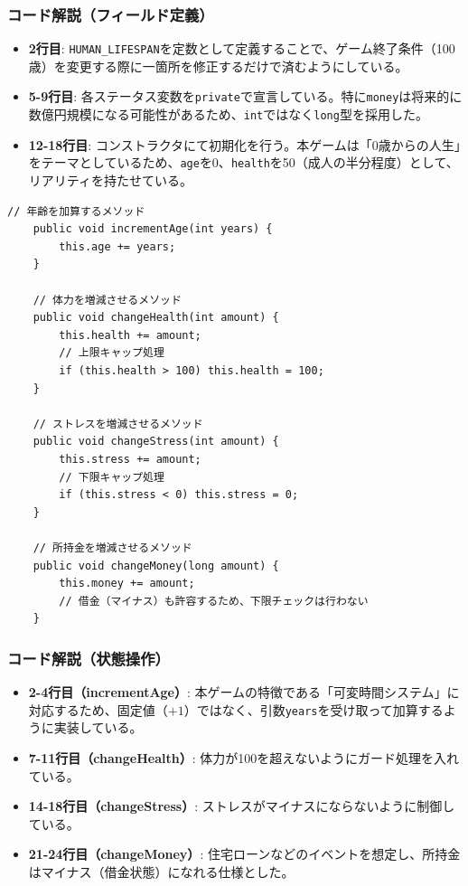 \documentclass[a4paper,11pt]{jsarticle}
\begin{document}
\subsubsection*{コード解説（フィールド定義）}
\begin{itemize}
    \item \textbf{2行目}: \texttt{HUMAN\_LIFESPAN}を定数として定義することで、ゲーム終了条件（100歳）を変更する際に一箇所を修正するだけで済むようにしている。
    \item \textbf{5-9行目}: 各ステータス変数を\texttt{private}で宣言している。特に\texttt{money}は将来的に数億円規模になる可能性があるため、\texttt{int}ではなく\texttt{long}型を採用した。
    \item \textbf{12-18行目}: コンストラクタにて初期化を行う。本ゲームは「0歳からの人生」をテーマとしているため、\texttt{age}を0、\texttt{health}を50（成人の半分程度）として、リアリティを持たせている。
\end{itemize}

\begin{lstlisting}[caption=Player.java（状態操作メソッド）, label=code:player_methods]
    // 年齢を加算するメソッド
    public void incrementAge(int years) {
        this.age += years;
    }

    // 体力を増減させるメソッド
    public void changeHealth(int amount) {
        this.health += amount;
        // 上限キャップ処理
        if (this.health > 100) this.health = 100;
    }

    // ストレスを増減させるメソッド
    public void changeStress(int amount) {
        this.stress += amount;
        // 下限キャップ処理
        if (this.stress < 0) this.stress = 0;
    }

    // 所持金を増減させるメソッド
    public void changeMoney(long amount) {
        this.money += amount;
        // 借金（マイナス）も許容するため、下限チェックは行わない
    }
\end{lstlisting}

\subsubsection*{コード解説（状態操作）}
\begin{itemize}
    \item \textbf{2-4行目（incrementAge）}: 本ゲームの特徴である「可変時間システム」に対応するため、固定値（$+1$）ではなく、引数\texttt{years}を受け取って加算するように実装している。
    \item \textbf{7-11行目（changeHealth）}: 体力が100を超えないようにガード処理を入れている。
    \item \textbf{14-18行目（changeStress）}: ストレスがマイナスにならないように制御している。
    \item \textbf{21-24行目（changeMoney）}: 住宅ローンなどのイベントを想定し、所持金はマイナス（借金状態）になれる仕様とした。
\end{itemize}
\end{document}
